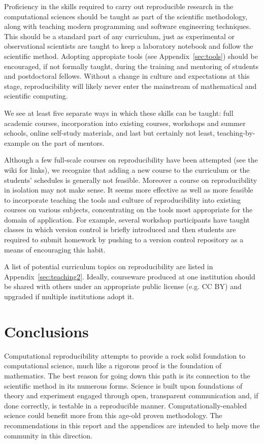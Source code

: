 \documentclass[11pt]{article}
\begin{document}
Proficiency in the skills required to carry out
reproducible research in the computational sciences should be taught as part
of the scientific methodology, along with teaching modern programming and
software engineering techniques. This should be a standard part of any
curriculum, just as experimental or observational scientists are taught
to keep a laboratory notebook and follow the scientific method.  
Adopting appropiate tools (see Appendix~\ref{sec:tools}) should be
encouraged, if not formally taught, during the training and mentoring of
students and postdoctoral fellows. Without a change in culture and
expectations at this stage, reproducibility will likely never enter the
mainstream of mathematical and scientific computing.

We see at least five separate ways in which these skills can be
taught: full academic courses, incorporation into existing
courses, workshops and summer schools, online self-study materials, and last
but certainly not least, teaching-by-example on the part of mentors. 

Although a few full-scale courses on reproducibility have been attempted
(see the wiki for links), we
recognize that adding a new course to the curriculum or the students'
schedules is generally not feasible.  Moreover a course on reproducibility
in isolation may not make sense.  It seems more effective as well as more
feasible to incorporate teaching the tools and culture of reproducibility
into existing courses on various subjects, concentrating on the tools most
appropriate for the domain of application.  For example, several workshop
participants have taught classes in which version control is briefly
introduced and then students are required to submit homework by pushing to a
version control repository as a means of encouraging this habit.

A list of potential curriculum topics on reproducibility are listed in 
Appendix~\ref{sec:teaching2}.
Ideally, courseware produced at one institution should be shared with others
under an appropriate public license (e.g. CC BY) and upgraded if multiple
institutions adopt it. 

\section{Conclusions} \label{sec:conclusions}

Computational reproducibility attempts to provide a rock solid foundation to
computational science, much like a rigorous proof is the foundation of
mathematics.  The best reason for going down this path is its connection to
the scientific method in its numerous forms.  Science is built upon
foundations of theory and experiment engaged through open, transparent
communication and, if done correctly, is testable in a
reproducible manner.  Computationally-enabled
science could benefit more from this age-old proven methodology.  
The recommendations in this report and the appendices are intended to help
move the community in this direction.
\end{document}
